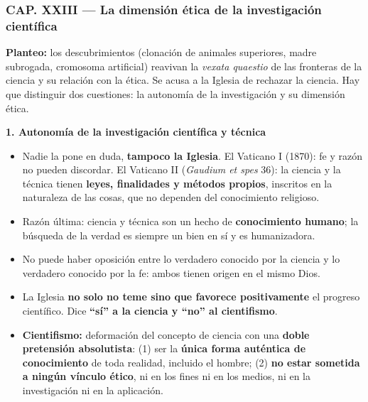 \documentclass[10pt,a4paper]{article}
\begin{document}
\subsubsection{CAP. XXIII --- La dimensión ética de la investigación científica}

\noindent \textbf{Planteo:} los descubrimientos (clonación de animales superiores, madre subrogada, cromosoma artificial) reavivan la \textit{vexata quaestio} de las fronteras de la ciencia y su relación con la ética. Se acusa a la Iglesia de rechazar la ciencia. Hay que distinguir dos cuestiones: la autonomía de la investigación y su dimensión ética.\par\smallskip

\medskip\noindent \textbf{1. Autonomía de la investigación científica y técnica}\par\nopagebreak
\begin{itemize}
\item Nadie la pone en duda, \textbf{tampoco la Iglesia}. El Vaticano I (1870): fe y razón no pueden discordar. El Vaticano II (\textit{Gaudium et spes} 36): la ciencia y la técnica tienen \textbf{leyes, finalidades y métodos propios}, inscritos en la naturaleza de las cosas, que no dependen del conocimiento religioso.
\item Razón última: ciencia y técnica son un hecho de \textbf{conocimiento humano}; la búsqueda de la verdad es siempre un bien en sí y es humanizadora.
\item No puede haber oposición entre lo verdadero conocido por la ciencia y lo verdadero conocido por la fe: ambos tienen origen en el mismo Dios.
\item La Iglesia \textbf{no solo no teme sino que favorece positivamente} el progreso científico. Dice \textbf{``sí'' a la ciencia y ``no'' al cientifismo}.
\item \textbf{Cientifismo:} deformación del concepto de ciencia con una \textbf{doble pretensión absolutista}: (1) ser la \textbf{única forma auténtica de conocimiento} de toda realidad, incluido el hombre; (2) \textbf{no estar sometida a ningún vínculo ético}, ni en los fines ni en los medios, ni en la investigación ni en la aplicación.
\end{itemize}
\end{document}
